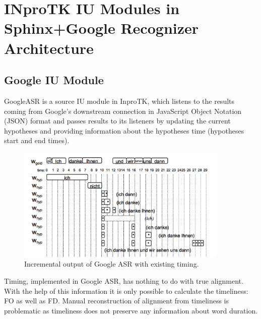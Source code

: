 \section {INproTK IU Modules in Sphinx+Google Recognizer Architecture}
\subsection  {Google IU Module}
GoogleASR is a source IU module in InproTK, which listens to the
results coming from Google's  downstream connection in JavaScript Object Notation (JSON) format and
passes results to its listeners by updating the current hypotheses and providing
information about the hypotheses time (hypotheses start and end times).
 \begin{figure}[htbp]
  \centering
   \includegraphics[width=0.9\textwidth]{images/google_output.png}
  \caption{Incremental output of Google ASR with existing timing.}
  \label{fig:google_ouput}
\end{figure}

Timing, implemented in Google ASR, has nothing to do with true alignment.
With the help of this information  it is only possible to calculate the
timeliness: FO as well as FD.  Manual reconstruction of alignment from
timeliness is problematic as timeliness does not preserve any information about word
duration. 

